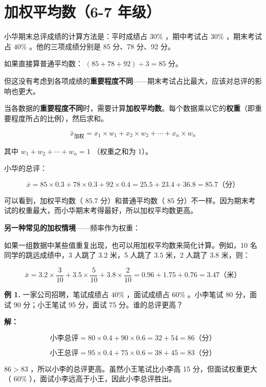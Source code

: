 \section*{加权平均数（6-7 年级）}


\begin{explore}


小华期末总评成绩的计算方法是：平时成绩占 $30\%$ ，期中考试占 $30\%$ ，期末考试占 $40\%$ 。他的三项成绩分别是 85 分、78 分、92 分。

如果直接算普通平均数： $(85 + 78 + 92) \div 3 = 85$ 分。

但这没有考虑到各项成绩的\textbf{重要程度不同}——期末考试占比最大，应该对总评的影响也更大。

\end{explore}

\begin{understand}


当各数据的\textbf{重要程度不同}时，需要计算\textbf{加权平均数}。每个数据乘以它的\textbf{权重}（即重要程度所占的比例），然后求和。

\[
\bar{x}_{\text{加权}} = x_1 \times w_1 + x_2 \times w_2 + \cdots + x_n \times w_n
\]


其中 $w_1 + w_2 + \cdots + w_n = 1$ （权重之和为 1）。

小华的总评：

\[
\bar{x} = 85 \times 0.3 + 78 \times 0.3 + 92 \times 0.4 = 25.5 + 23.4 + 36.8 = 85.7 \text{（分）}
\]


可以看到，加权平均数（ $85.7$ 分）和普通平均数（ $85$ 分）不一样。因为期末考试的权重最大，而小华期末考得最好，所以加权平均数更高。

\textbf{另一种常见的加权情境}——频率作为权重：

如果一组数据中某些值重复出现，也可以用加权平均数来简化计算。例如，10 名同学的跳远成绩中，3 人跳了 $3.2$ 米，5 人跳了 $3.5$ 米，2 人跳了 $3.8$ 米，则：

\[
\bar{x} = 3.2 \times \frac{3}{10} + 3.5 \times \frac{5}{10} + 3.8 \times \frac{2}{10} = 0.96 + 1.75 + 0.76 = 3.47 \text{（米）}
\]


\end{understand}

\begin{workedexamples}


\textbf{例 1.} 一家公司招聘，笔试成绩占 $40\%$ ，面试成绩占 $60\%$ 。小李笔试 80 分，面试 90 分；小王笔试 95 分，面试 75 分。谁的总评更高？

\textbf{解：}

\[
\text{小李总评} = 80 \times 0.4 + 90 \times 0.6 = 32 + 54 = 86 \text{（分）}
\]


\[
\text{小王总评} = 95 \times 0.4 + 75 \times 0.6 = 38 + 45 = 83 \text{（分）}
\]


$86 > 83$ ，所以小李的总评更高。虽然小王笔试比小李高 15 分，但面试权重更大（ $60\%$ ），面试小李远高于小王，因此小李总评胜出。

\end{workedexamples}

